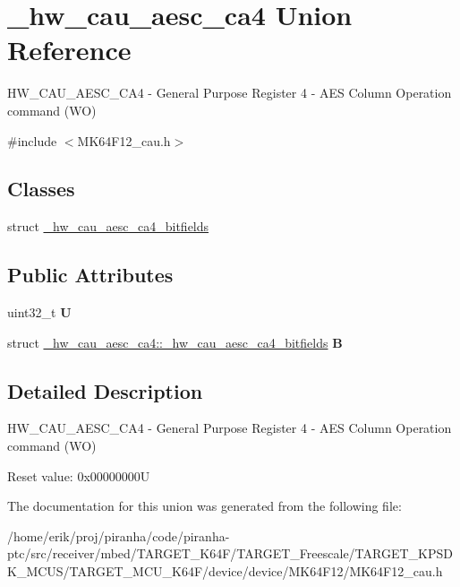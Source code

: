 \hypertarget{union__hw__cau__aesc__ca4}{}\section{\+\_\+hw\+\_\+cau\+\_\+aesc\+\_\+ca4 Union Reference}
\label{union__hw__cau__aesc__ca4}


H\+W\+\_\+\+C\+A\+U\+\_\+\+A\+E\+S\+C\+\_\+\+C\+A4 -\/ General Purpose Register 4 -\/ A\+ES Column Operation command (WO)  




{\ttfamily \#include $<$M\+K64\+F12\+\_\+cau.\+h$>$}

\subsection*{Classes}
\begin{DoxyCompactItemize}
\item 
struct \hyperlink{struct__hw__cau__aesc__ca4_1_1__hw__cau__aesc__ca4__bitfields}{\+\_\+hw\+\_\+cau\+\_\+aesc\+\_\+ca4\+\_\+bitfields}
\end{DoxyCompactItemize}
\subsection*{Public Attributes}
\begin{DoxyCompactItemize}
\item 
uint32\+\_\+t {\bfseries U}\hypertarget{union__hw__cau__aesc__ca4_ae8cd385882814862771f80f743d68c7c}{}\label{union__hw__cau__aesc__ca4_ae8cd385882814862771f80f743d68c7c}

\item 
struct \hyperlink{struct__hw__cau__aesc__ca4_1_1__hw__cau__aesc__ca4__bitfields}{\+\_\+hw\+\_\+cau\+\_\+aesc\+\_\+ca4\+::\+\_\+hw\+\_\+cau\+\_\+aesc\+\_\+ca4\+\_\+bitfields} {\bfseries B}\hypertarget{union__hw__cau__aesc__ca4_a773fd5abc1c81f7b8f9e314ac192373a}{}\label{union__hw__cau__aesc__ca4_a773fd5abc1c81f7b8f9e314ac192373a}

\end{DoxyCompactItemize}


\subsection{Detailed Description}
H\+W\+\_\+\+C\+A\+U\+\_\+\+A\+E\+S\+C\+\_\+\+C\+A4 -\/ General Purpose Register 4 -\/ A\+ES Column Operation command (WO) 

Reset value\+: 0x00000000U 

The documentation for this union was generated from the following file\+:\begin{DoxyCompactItemize}
\item 
/home/erik/proj/piranha/code/piranha-\/ptc/src/receiver/mbed/\+T\+A\+R\+G\+E\+T\+\_\+\+K64\+F/\+T\+A\+R\+G\+E\+T\+\_\+\+Freescale/\+T\+A\+R\+G\+E\+T\+\_\+\+K\+P\+S\+D\+K\+\_\+\+M\+C\+U\+S/\+T\+A\+R\+G\+E\+T\+\_\+\+M\+C\+U\+\_\+\+K64\+F/device/device/\+M\+K64\+F12/M\+K64\+F12\+\_\+cau.\+h\end{DoxyCompactItemize}
